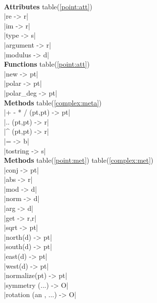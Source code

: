 \documentclass[DIV         = 14,
               fontsize    = 10,
               index       = totoc,
               twoside,
               cadre,
               headings    = small
               ]{tkz-doc}
\begin{document}
\begin{multicols}{3}
\\
\textbf{Attributes} table(\ref{point:att})   \\
|re                        -> r|   \\
|im                        -> r|   \\
|type                      -> s|   \\
|argument                  -> r|   \\
|modulus                   -> d|   \\
\textbf{Functions} table(\ref{point:att})   \\
|new                       -> pt|  \\
|polar                     -> pt|  \\
|polar_deg                 -> pt|  \\
\textbf{Methods} table(\ref{complex:meta})  \\
|+ - * /     (pt,pt)       -> pt|  \\
|..          (pt,pt)       -> r|   \\
|^           (pt,pt)       -> r|   \\
|=                         -> b|   \\
|tostring                  -> s|   \\
\textbf{Methods} table(\ref{point:met})  table(\ref{complex:met})    \\
|conj                      -> pt|  \\
|abs                       -> r|   \\
|mod                       -> d|   \\
|norm                      -> d|   \\
|arg                       -> d|   \\
|get                       -> r,r| \\
|sqrt                      -> pt|  \\
|north(d)                  -> pt|  \\
|south(d)                  -> pt|  \\
|east(d)                   -> pt|  \\
|west(d)                   -> pt|  \\
|normalize(pt)             -> pt|  \\
|symmetry (...)            -> O|   \\
|rotation (an , ...)       -> O|   \\

\end{multicols}
\end{document}
